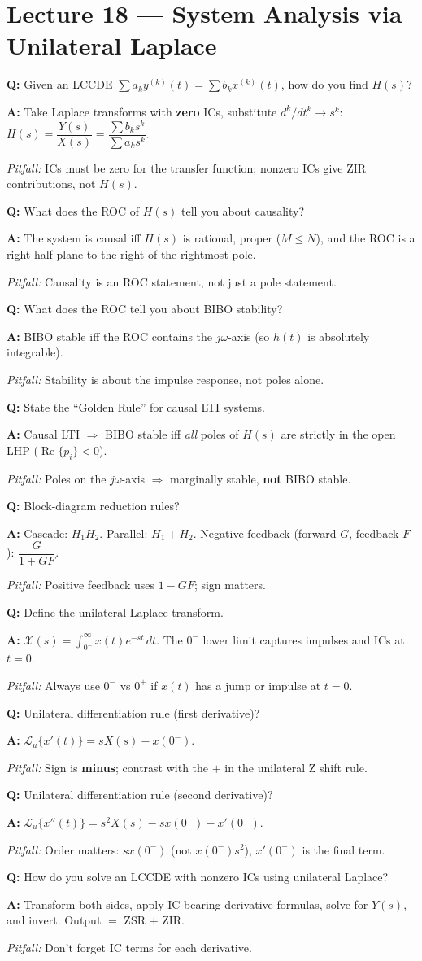 \documentclass[11pt]{article}
\newcommand{\Q}[1]{\par\medskip\noindent\textbf{Q:} #1}
\newcommand{\A}[1]{\par\noindent\textbf{A:} #1}
\newcommand{\Pit}[1]{\par\noindent\textit{Pitfall:} #1}
\begin{document}
\section{Lecture 18 --- System Analysis via Unilateral Laplace}

\Q{Given an LCCDE $\sum a_k y^{(k)}(t) = \sum b_k x^{(k)}(t)$, how do you find $H(s)$?}
\A{Take Laplace transforms with \textbf{zero} ICs, substitute $d^k/dt^k \to s^k$: $H(s) = \dfrac{Y(s)}{X(s)} = \dfrac{\sum b_k s^k}{\sum a_k s^k}$.}
\Pit{ICs must be zero for the transfer function; nonzero ICs give ZIR contributions, not $H(s)$.}

\Q{What does the ROC of $H(s)$ tell you about causality?}
\A{The system is causal iff $H(s)$ is rational, proper ($M\le N$), and the ROC is a right half-plane to the right of the rightmost pole.}
\Pit{Causality is an ROC statement, not just a pole statement.}

\Q{What does the ROC tell you about BIBO stability?}
\A{BIBO stable iff the ROC contains the $j\omega$-axis (so $h(t)$ is absolutely integrable).}
\Pit{Stability is about the impulse response, not poles alone.}

\Q{State the ``Golden Rule'' for causal LTI systems.}
\A{Causal LTI $\Rightarrow$ BIBO stable iff \emph{all} poles of $H(s)$ are strictly in the open LHP ($\operatorname{Re}\{p_i\}<0$).}
\Pit{Poles on the $j\omega$-axis $\Rightarrow$ marginally stable, \textbf{not} BIBO stable.}

\Q{Block-diagram reduction rules?}
\A{Cascade: $H_1 H_2$. Parallel: $H_1 + H_2$. Negative feedback (forward $G$, feedback $F$): $\dfrac{G}{1+GF}$.}
\Pit{Positive feedback uses $1-GF$; sign matters.}

\Q{Define the unilateral Laplace transform.}
\A{$\mathcal{X}(s) = \displaystyle\int_{0^-}^{\infty} x(t)e^{-st}\,dt$. The $0^-$ lower limit captures impulses and ICs at $t=0$.}
\Pit{Always use $0^-$ vs $0^+$ if $x(t)$ has a jump or impulse at $t=0$.}

\Q{Unilateral differentiation rule (first derivative)?}
\A{$\mathcal{L}_u\{x'(t)\} = sX(s) - x(0^-)$.}
\Pit{Sign is \textbf{minus}; contrast with the $+$ in the unilateral Z shift rule.}

\Q{Unilateral differentiation rule (second derivative)?}
\A{$\mathcal{L}_u\{x''(t)\} = s^2 X(s) - sx(0^-) - x'(0^-)$.}
\Pit{Order matters: $sx(0^-)$ (not $x(0^-)s^2$), $x'(0^-)$ is the final term.}

\Q{How do you solve an LCCDE with nonzero ICs using unilateral Laplace?}
\A{Transform both sides, apply IC-bearing derivative formulas, solve for $Y(s)$, and invert. Output $=$ ZSR $+$ ZIR.}
\Pit{Don't forget IC terms for each derivative.}
\end{document}
